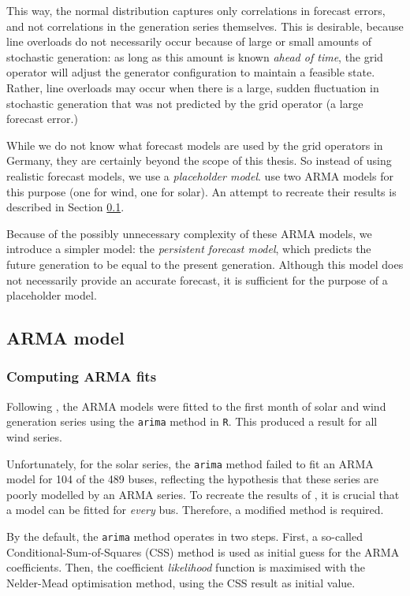 \documentclass[main.tex]{subfiles}
\begin{document}
This way, the normal distribution captures only correlations in forecast errors, and not correlations in the generation series themselves. This is desirable, because line overloads do not necessarily occur because of large or small amounts of stochastic generation: as long as this amount is known \emph{ahead of time}, the grid operator will adjust the generator configuration to maintain a feasible state. Rather, line overloads may occur when there is a large, sudden fluctuation in stochastic generation that was not predicted by the grid operator (\ie a large forecast error.)

While we do not know what forecast models are used by the grid operators in Germany, they are certainly beyond the scope of this thesis. So instead of using realistic forecast models, we use a \emph{placeholder model}. \cite{Nesti2018emergentfailures} use two ARMA models for this purpose (one for wind, one for solar). An attempt to recreate their results is described in Section \ref{sec:armamodel}. 

Because of the possibly unnecessary complexity of these ARMA models, we introduce a simpler model: the \emph{persistent forecast model}, which predicts the future generation to be equal to the present generation. Although this model does not necessarily provide an accurate forecast, it is sufficient for the purpose of a placeholder model.

\subsection{ARMA model}\label{sec:armamodel}

\subsubsection{Computing ARMA fits}\label{arimamod}
Following \cite{Nesti2018emergentfailures}, the ARMA models were fitted to the first month of solar and wind generation series using the \texttt{arima} method in \texttt{R}. This produced a result for all wind series.

Unfortunately, for the solar series, the \texttt{arima} method failed to fit an ARMA model for 104 of the 489 buses, reflecting the hypothesis that these series are poorly modelled by an ARMA series. To recreate the results of \cite{Nesti2018emergentfailures}, it is crucial that a model can be fitted for \emph{every} bus. Therefore, a modified method is required.

By the default, the \texttt{arima} method operates in two steps. First, a so-called Conditional-Sum-of-Squares (CSS) method is used as initial guess for the ARMA coefficients. Then, the coefficient \emph{likelihood} function is maximised with the Nelder-Mead optimisation method, using the CSS result as initial value.
\end{document}
